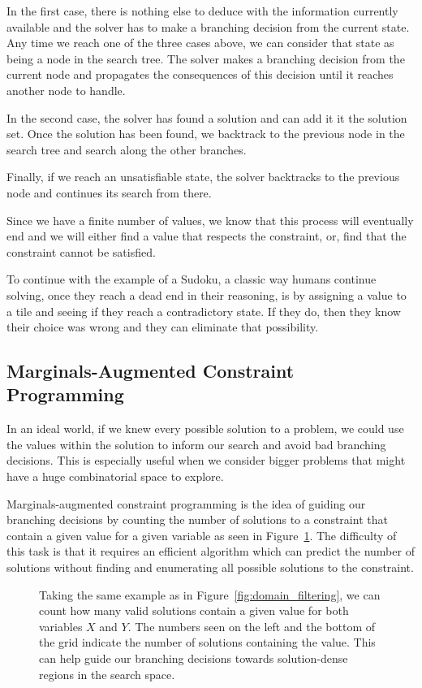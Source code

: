 \documentclass[../Document.tex]{subfiles}
\begin{document}
In the first case, there is nothing else to deduce with the information currently available and the solver has to make a branching decision from the current state. Any time we reach one of the three cases above, we can consider that state as being a node in the search tree. The solver makes a branching decision from the current node and propagates the consequences of this decision until it reaches another node to handle.

In the second case, the solver has found a solution and can add it it the solution set. Once the solution has been found, we backtrack to the previous node in the search tree and search along the other branches.

Finally, if we reach an unsatisfiable state, the solver backtracks to the previous node and continues its search from there.

Since we have a finite number of values, we know that this process will eventually end and we will either find a value that respects the constraint, or, find that the constraint cannot be satisfied.

To continue with the example of a Sudoku, a classic way humans continue solving, once they reach a dead end in their reasoning, is by assigning a value to a tile and seeing if they reach a contradictory state.
If they do, then they know their choice was wrong and they can eliminate that possibility.


\subsection{Marginals-Augmented Constraint Programming}
In an ideal world, if we knew every possible solution to a problem, we could use the values within the solution to inform our search and avoid bad branching decisions. This is especially useful when we consider bigger problems that might have a huge combinatorial space to explore.

Marginals-augmented constraint programming is the idea of guiding our branching decisions by counting the number of solutions to a constraint that contain a given value for a given variable as seen in Figure~\ref{fig:marginal_cp}. The difficulty of this task is that it requires an efficient algorithm which can predict the number of solutions without finding and enumerating all possible solutions to the constraint.

\begin{figure}[ht]
    \centering
    
    \caption[Marginal-Augmented \acrlong{cp}.]{Taking the same example as in Figure~\ref{fig:domain_filtering}, we can count how many valid solutions contain a given value for both variables $X$ and $Y$. The numbers seen on the left and the bottom of the grid indicate the number of solutions containing the value. This can help guide our branching decisions towards solution-dense regions in the search space.}
    \label{fig:marginal_cp}
\end{figure}
\end{document}
